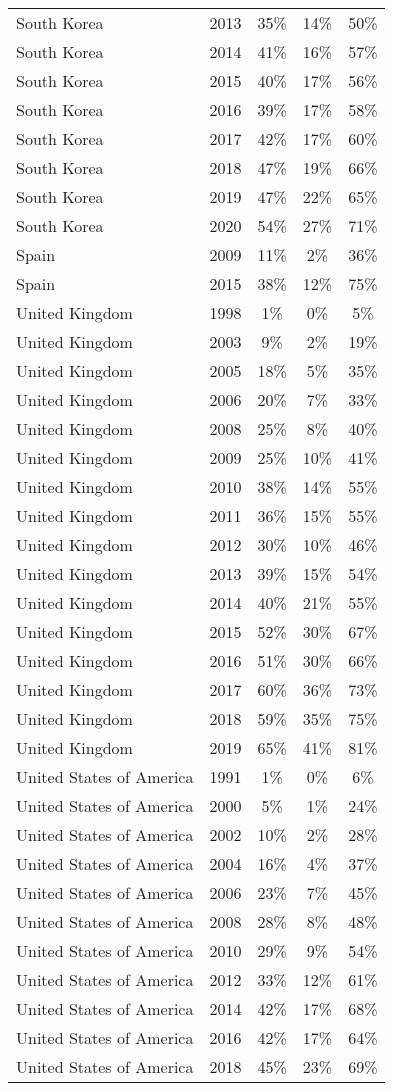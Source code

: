 \begin{longtable}[t]{lcccc}
South Korea & 2013 & 35\% & 14\% & 50\%\\
South Korea & 2014 & 41\% & 16\% & 57\%\\
South Korea & 2015 & 40\% & 17\% & 56\%\\
South Korea & 2016 & 39\% & 17\% & 58\%\\
South Korea & 2017 & 42\% & 17\% & 60\%\\
South Korea & 2018 & 47\% & 19\% & 66\%\\
South Korea & 2019 & 47\% & 22\% & 65\%\\
South Korea & 2020 & 54\% & 27\% & 71\%\\
\addlinespace
Spain & 2009 & 11\% & 2\% & 36\%\\
Spain & 2015 & 38\% & 12\% & 75\%\\
\addlinespace
United Kingdom & 1998 & 1\% & 0\% & 5\%\\
United Kingdom & 2003 & 9\% & 2\% & 19\%\\
United Kingdom & 2005 & 18\% & 5\% & 35\%\\
United Kingdom & 2006 & 20\% & 7\% & 33\%\\
United Kingdom & 2008 & 25\% & 8\% & 40\%\\
United Kingdom & 2009 & 25\% & 10\% & 41\%\\
United Kingdom & 2010 & 38\% & 14\% & 55\%\\
United Kingdom & 2011 & 36\% & 15\% & 55\%\\
United Kingdom & 2012 & 30\% & 10\% & 46\%\\
United Kingdom & 2013 & 39\% & 15\% & 54\%\\
United Kingdom & 2014 & 40\% & 21\% & 55\%\\
United Kingdom & 2015 & 52\% & 30\% & 67\%\\
United Kingdom & 2016 & 51\% & 30\% & 66\%\\
United Kingdom & 2017 & 60\% & 36\% & 73\%\\
United Kingdom & 2018 & 59\% & 35\% & 75\%\\
United Kingdom & 2019 & 65\% & 41\% & 81\%\\
\addlinespace
United States of America & 1991 & 1\% & 0\% & 6\%\\
United States of America & 2000 & 5\% & 1\% & 24\%\\
United States of America & 2002 & 10\% & 2\% & 28\%\\
United States of America & 2004 & 16\% & 4\% & 37\%\\
United States of America & 2006 & 23\% & 7\% & 45\%\\
United States of America & 2008 & 28\% & 8\% & 48\%\\
United States of America & 2010 & 29\% & 9\% & 54\%\\
United States of America & 2012 & 33\% & 12\% & 61\%\\
United States of America & 2014 & 42\% & 17\% & 68\%\\
United States of America & 2016 & 42\% & 17\% & 64\%\\
United States of America & 2018 & 45\% & 23\% & 69\%\\*
\end{longtable}
\endgroup{}
